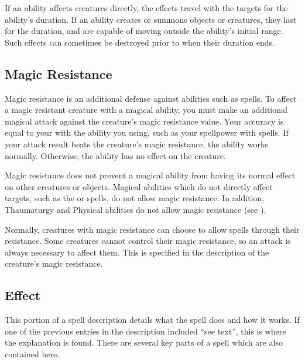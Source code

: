          If an ability affects creatures directly, the effects travel with the targets for the ability's duration.
        If an ability creates or summons objects or creatures, they last for the duration, and are capable of moving outside the ability's initial range.
        Such effects can sometimes be destroyed prior to when their duration ends.



    \subsection{Magic Resistance}\label{Magic Resistance}
        Magic resistance is an additional defense against  abilities such as spells.
        To affect a magic resistant creature with a magical ability, you must make an additional magical attack against the creature's magic resistance value.
        Your accuracy is equal to your  with the ability you using, such as your spellpower with spells.
        If your attack result beats the creature's magic resistance, the ability works normally.
        Otherwise, the ability has no effect on the creature.

        Magic resistance does not prevent a magical ability from having its normal effect on other creatures or objects.
        Magical abilities which do not directly affect targets, such as the  or  spells, do not allow magic resistance.
        In addition, Thaumaturgy and Physical abilities do not allow magic resistance (see ).

        Normally, creatures with magic resistance can choose to allow spells through their resistance.
        Some creatures cannot control their magic resistance, so an attack is always necessary to affect them.
        This is specified in the description of the creature's magic resistance.

    \subsection{Effect}
        This portion of a spell description details what the spell does and how it works.
        If one of the previous entries in the description included ``see text'', this is where the explanation is found.
        There are several key parts of a spell which are also contained here.

